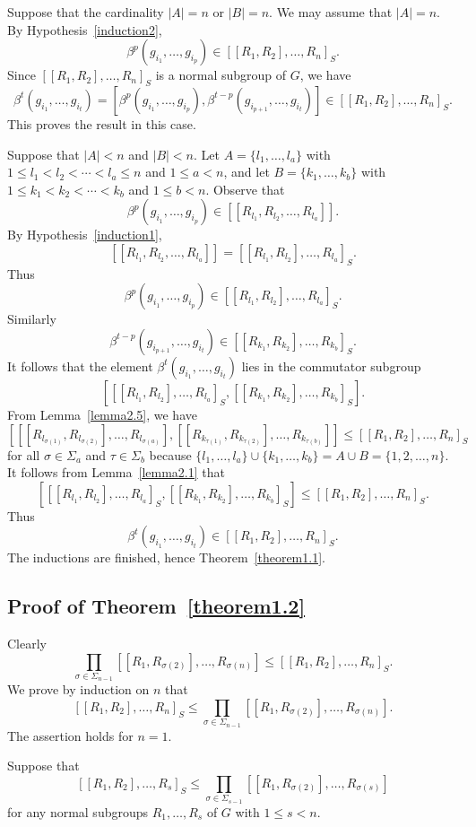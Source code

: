 \documentclass[10pt]{amsart}
\numberwithin{equation}{section}
\begin{document}
Suppose that the cardinality $|A|=n$ or $|B|=n$. We may assume that $|A|=n$. By Hypothesis~\ref{induction2},
$$
\beta^p(g_{i_1},\ldots,g_{i_p})\in [[R_1,R_2],\ldots,R_n]_S.
$$
Since $[[R_1,R_2],\ldots,R_n]_S$ is a normal subgroup of $G$, we have
$$
\beta^t(g_{i_1},\ldots,g_{i_t})=[\beta^p(g_{i_1},\ldots,g_{i_p}), \beta^{t-p}(g_{i_{p+1}},\ldots,g_{i_t})]\in [[R_1,R_2],\ldots,R_n]_S.
$$
This proves the result in this case.

Suppose that $|A|<n$ and $|B|<n$. Let $A=\{l_1,\ldots,l_a\}$ with $1\leq l_1<l_2<\cdots<l_a\leq n$ and $1\leq a<n$, and let $B=\{k_1,\ldots,k_b\}$ with $1\leq k_1<k_2<\cdots< k_b$ and $1\leq b<n$. Observe that
$$
\beta^p(g_{i_1},\ldots,g_{i_p})\in [[R_{l_1},R_{l_2},\ldots,R_{l_a}]].
$$
By Hypothesis~\ref{induction1},
$$
[[R_{l_1},R_{l_2},\ldots,R_{l_a}]]=[[R_{l_1},R_{l_2}],\ldots,R_{l_a}]_S.
$$
Thus
$$
\beta^p(g_{i_1},\ldots,g_{i_p})\in [[R_{l_1},R_{l_2}],\ldots,R_{l_a}]_S.
$$
Similarly
$$
\beta^{t-p}(g_{i_{p+1}},\ldots,g_{i_t})\in [[R_{k_1},R_{k_2}],\ldots,R_{k_b}]_S.
$$
It follows that the element
$\beta^t(g_{i_1},\ldots,g_{i_t})$ lies in the commutator subgroup
$$
\left[[[R_{l_1},R_{l_2}],\ldots,R_{l_a}]_S, [[R_{k_1},R_{k_2}],\ldots,R_{k_b}]_S\right].
$$
From Lemma~\ref{lemma2.5}, we have
$$
\left[[[R_{l_{\sigma(1)}},R_{l_{\sigma(2)}}],\ldots,R_{l_{\sigma(a)}}], [[R_{k_{\tau(1)}},R_{k_{\tau(2)}}],\ldots,R_{k_{\tau(b)}}]\right]\leq [[R_1,R_2],\ldots,R_n]_S
$$
for all $\sigma\in\Sigma_a$ and $\tau\in\Sigma_b$ because $\{l_1,\ldots,l_a\}\cup \{k_1,\ldots,k_b\}=A\cup B=\{1,2,\ldots,n\}$. It follows from Lemma~\ref{lemma2.1} that
$$
\left[[[R_{l_1},R_{l_2}],\ldots,R_{l_a}]_S, [[R_{k_1},R_{k_2}],\ldots,R_{k_b}]_S\right]\leq [[R_1,R_2],\ldots,R_n]_S.
$$
Thus
$$
\beta^t(g_{i_1},\ldots,g_{i_t})\in [[R_1,R_2],\ldots,R_n]_S.
$$
The inductions are finished, hence Theorem~\ref{theorem1.1}.

\subsection{Proof of Theorem~\ref{theorem1.2}}
Clearly $$\prod_{\sigma\in \Sigma_{n-1}}[[R_{1},R_{\sigma(2)}],\ldots,R_{\sigma(n)}]\leq [[R_1,R_2],\ldots,R_n]_S.$$
We prove by induction on $n$ that $$[[R_1,R_2],\ldots,R_n]_S\leq \prod_{\sigma\in \Sigma_{n-1}}[[R_{1},R_{\sigma(2)}],\ldots,R_{\sigma(n)}].$$ The assertion holds for $n=1$.

Suppose that
$$
[[R_1,R_2],\ldots, R_s]_S\leq \prod_{\sigma\in \Sigma_{s-1}}[[R_{1},R_{\sigma(2)}],\ldots,R_{\sigma(s)}]
$$
for any normal subgroups $R_1,\ldots,R_s$ of $G$ with $1\leq s<n$.
\end{document}
